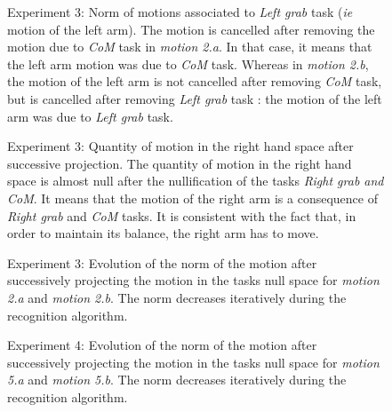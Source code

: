 \documentclass[journal]{IEEEtran}
\begin{document}
\begin{figure}[hp]
  \centering
  \subfigure[Motion 2.a]{
  \resizebox{.46\textwidth}{!} {
  
  }
  \label{fig:exp1:Evolution2L:a}
  }
  \subfigure[Motion 2.b]{
  \resizebox{.46\textwidth}{!} {
  
  }
  \label{fig:exp1:Evolution2L:b}
  }
  \caption{Experiment 3: Norm of motions associated to \emph{Left grab} task (\emph{ie} motion of the left arm).
  The motion is cancelled after removing the motion due to \emph{CoM} task
  in \emph{motion 2.a}. In that case, it means that the left arm motion was due to \emph{CoM} task.
  Whereas in \emph{motion 2.b}, the motion of the left arm is not cancelled after
  removing \emph{CoM} task, but is cancelled after removing
  \emph{Left grab} task : the motion of the left arm was due
  to \emph{Left grab} task.}
  \label{fig:exp1:Evolution2L}
\end{figure}
\begin{figure}[p]
  \centering
  \subfigure[Motion 2.a]{
  \resizebox{.46\textwidth}{!} {
  
  }
  \label{fig:exp1:Evolution2R:a}
  }
  \subfigure[Motion 2.b]{
  \resizebox{.46\textwidth}{!} {
  
  }
  \label{fig:exp1:Evolution2R:b}
  }
  \caption{Experiment 3: Quantity of motion in the right hand space after successive projection.
    The quantity of motion in the right hand space is almost null
      after the nullification of the tasks \emph{Right grab and CoM}.
  It means that the motion of the right arm is a consequence of
  \emph{Right grab} and \emph{CoM} tasks. It is consistent with the fact that,
  in order to maintain its balance, the right arm has to move.}
  \label{fig:exp1:Evolution2R}
\end{figure}
\begin{figure}[p]
  \centering
  \subfigure[Motion 2.a]{
  \resizebox{.46\textwidth}{!} {
    
  }
  \label{fig:exp1:PqdotNormsR}
  }
  \subfigure[Motion 2.b]{
  \resizebox{.46\textwidth}{!} {
    
  }
\label{fig:exp1:PqdotNormsRL}
}
\caption{Experiment 3: Evolution of the norm of the motion after successively projecting the motion in the tasks null space for
\emph{motion 2.a} and \emph{motion 2.b}. The norm decreases iteratively during the recognition algorithm.}
\label{fig:exp1:PqdotNorms}
\end{figure}
\setcounter{figure}{16}
\begin{figure}[p]
  \centering
  \subfigure[Motion 5.a]{
  \resizebox{.46\textwidth}{!} {
    
  }
  }
  \subfigure[Motion 5.b]{
  \resizebox{.46\textwidth}{!} {
    
  }
}
\caption{Experiment 4: Evolution of the norm of the motion after successively projecting the motion in the tasks null space for
\emph{motion 5.a} and \emph{motion 5.b}. The norm decreases iteratively during the recognition algorithm.}
\label{fig:exp6:PqdotNorms5}
\end{figure}
\end{document}
